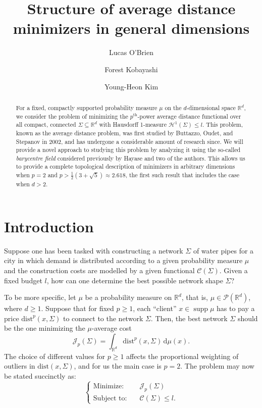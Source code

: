 \documentclass[preprint, reqno]{amsart}
\author[L.\ O'Brien]{Lucas O'Brien}
\author[F.\ Kobayashi]{Forest Kobayashi}
\author[Y.H.\ Kim]{Young-Heon Kim}
\date{}
\title{Structure of average distance minimizers in general dimensions}
\DeclareMathOperator*{\supp}{supp}
\newcommand{\dist}{\mathrm{dist}}
\theoremstyle{definition}
\numberwithin{equation}{section}
\begin{document}
\begin{abstract}
  For a fixed, compactly supported probability measure $\mu$ on the
  $d$-dimensional space $\mathbb{R}^d$, we consider the problem of
  minimizing the $p^{\mathrm{th}}$-power average distance functional
  over all compact, connected $\Sigma \subseteq \mathbb{R}^d$ with
  Hausdorff 1-measure $\mathcal{H}^1(\Sigma) \leq l$. This problem,
  known as the average distance problem, was first studied by
  Buttazzo, Oudet, and Stepanov in 2002, and has undergone a
  considerable amount of research since. We will provide a novel
  approach to studying this problem by analyzing it using the
  so-called \textit{barycentre field} considered previously by Hayase
  and two of the authors. This allows us to provide a complete
  topological description of minimizers in arbitrary dimensions when
  $p = 2$ and $p > \frac{1}{2}(3 + \sqrt{5}) \approx 2.618$, the first
  such result that includes the case when $d > 2$.
\end{abstract}


\maketitle

\tableofcontents


\section{Introduction}\label{sec:introduction}

Suppose one has been tasked with constructing a network $\Sigma$ of
water pipes for a city in which demand is distributed according to a
given probability measure $\mu$ and the construction costs are
modelled by a given functional $\mathscr{C}(\Sigma)$. Given a fixed
budget $l$, how can one determine the best possible network shape
$\Sigma$?

To be more specific, let $\mu$ be a probability measure on
$\mathbb{R}^d$, that is, $\mu \in \mathcal P(\mathbb R^d)$, where
$d\ge 1$. Suppose that for fixed $p \geq 1$, each ``client'' $x \in
\supp \mu$ has to pay a price $\dist^p(x, \Sigma)$ to connect to the
network $\Sigma$. Then, the best network $\Sigma$ should be the one
minimizing the $\mu$-average cost
\[
  \mathscr J_p(\Sigma) = \int_{\mathbb R^d} \dist^p(x, \Sigma) \,
  \mathrm{d}\mu(x).
\]
The choice of different values for $p \geq 1$ affects the proportional
weighting of outliers in $\dist(x, \Sigma)$, and for us the main case
is $p=2$. The problem may now be stated succinctly as:
\begin{equation}
  \begin{cases}
    \text{Minimize:} \quad
    & \mathscr J_p(\Sigma) \\
    \text{Subject to:} \quad
    & \mathscr C(\Sigma) \leq l.
  \end{cases}
  \label{eq:objective-minimization}
\end{equation}
\end{document}
